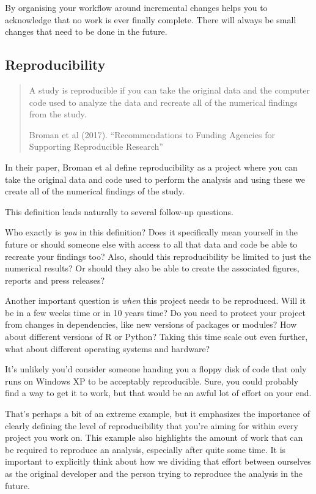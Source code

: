 \documentclass[
  12pt,
]{book}
\begin{document}
By organising your workflow around incremental changes helps you to acknowledge that no work is ever finally complete. There will always be small changes that need to be done in the future.

\hypertarget{reproducibility}{%
\subsection{Reproducibility}\label{reproducibility}}

\begin{quote}
A study is reproducible if you can take the original data and the computer code used to analyze the data and recreate all of the numerical findings from the study.

Broman et al (2017). ``Recommendations to Funding Agencies for Supporting Reproducible Research''
\end{quote}

In their paper, Broman et al define reproducibility as a project where you can take the original data and code used to perform the analysis and using these we create all of the numerical findings of the study.

This definition leads naturally to several follow-up questions.

Who exactly is \emph{you} in this definition? Does it specifically mean yourself in the future or should someone else with access to all that data and code be able to recreate your findings too? Also, should this reproducibility be limited to just the numerical results? Or should they also be able to create the associated figures, reports and press releases?

Another important question is \emph{when} this project needs to be reproduced. Will it be in a few weeks time or in 10 years time? Do you need to protect your project from changes in dependencies, like new versions of packages or modules? How about different versions of R or Python? Taking this time scale out even further, what about different operating systems and hardware?

It's unlikely you'd consider someone handing you a floppy disk of code that only runs on Windows XP to be acceptably reproducible. Sure, you could probably find a way to get it to work, but that would be an awful lot of effort on your end.

That's perhaps a bit of an extreme example, but it emphasizes the importance of clearly defining the level of reproducibility that you're aiming for within every project you work on. This example also highlights the amount of work that can be required to reproduce an analysis, especially after quite some time. It is important to explicitly think about how we dividing that effort between ourselves as the original developer and the person trying to reproduce the analysis in the future.
\end{document}
